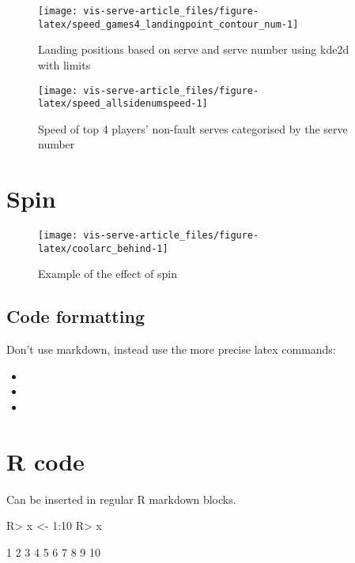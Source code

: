 \documentclass[article]{jss}
\providecommand{\tightlist}{%
  \setlength{\itemsep}{0pt}\setlength{\parskip}{0pt}}
\begin{document}
\begin{CodeChunk}
\begin{figure}

{\centering \texttt{[image: vis-serve-article\_files/figure-latex/speed\_games4\_landingpoint\_contour\_num-1]} 

}

\caption[Landing positions based on serve and serve number using kde2d with limits]{Landing positions based on serve and serve number using kde2d with limits}\label{fig:speed_games4_landingpoint_contour_num}
\end{figure}
\end{CodeChunk}

\begin{CodeChunk}
\begin{figure}

{\centering \texttt{[image: vis-serve-article\_files/figure-latex/speed\_allsidenumspeed-1]} 

}

\caption[Speed of top 4 players' non-fault serves categorised by the serve number]{Speed of top 4 players' non-fault serves categorised by the serve number}\label{fig:speed_allsidenumspeed}
\end{figure}
\end{CodeChunk}

\section{Spin}\label{spin}

\begin{CodeChunk}
\begin{figure}

{\centering \texttt{[image: vis-serve-article\_files/figure-latex/coolarc\_behind-1]} 

}

\caption[Example of the effect of spin]{Example of the effect of spin}\label{fig:coolarc_behind}
\end{figure}
\end{CodeChunk}

\subsection{Code formatting}\label{code-formatting}

Don't use markdown, instead use the more precise latex commands:

\begin{itemize}
\tightlist
\item
\item
\item
\end{itemize}

\section{R code}\label{r-code}

Can be inserted in regular R markdown blocks.

\begin{CodeChunk}
\begin{CodeInput}
R> x <- 1:10
R> x
\end{CodeInput}
\begin{CodeOutput}
 [1]  1  2  3  4  5  6  7  8  9 10
\end{CodeOutput}
\end{CodeChunk}
\end{document}
